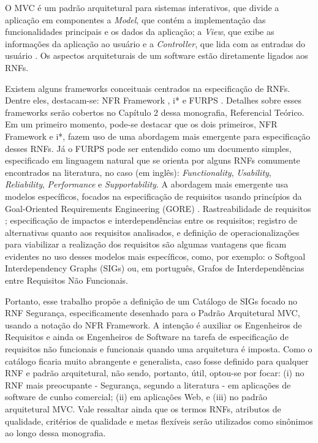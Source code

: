 O MVC é um padrão arquitetural para sistemas interativos, que divide a aplicação em componentes a \textit{Model}, que contém a implementação das funcionalidades principais e os dados da aplicação; a \textit{View}, que exibe as informações da aplicação ao usuário e a \textit{Controller}, que lida com as entradas do usuário \cite{buschmann1996system}. Os aspectos arquiteturais de um software estão diretamente ligados aos RNFs.



Existem alguns frameworks conceituais centrados na especificação de RNFs. Dentre eles, destacam-se: NFR Framework \cite{chung2009non}, i* \cite{istarwiki20} e FURPS \cite{umar2011analyzing}. Detalhes sobre esses frameworks serão cobertos no Capítulo 2 dessa monografia, Referencial Teórico. Em um primeiro momento, pode-se destacar que os dois primeiros, NFR Framework e i*, fazem uso de uma abordagem mais emergente para especificação desses RNFs. Já o FURPS pode ser entendido como um documento simples, especificado em linguagem natural que se orienta por alguns RNFs comumente encontrados na literatura, no caso (em inglês): \textit{Functionality}, \textit{Usability}, \textit{Reliability}, \textit{Performance} e \textit{Supportability}.
A abordagem mais emergente usa modelos específicos, focados na especificação de requisitos usando princípios da Goal-Oriented Requirements Engineering (GORE) \cite{horkoff2016goal}. Rastreabilidade de requisitos \cite{wiegers2013software}; especificação de impactos e interdependências entre os requisitos; registro de alternativas quanto aos requisitos analisados, e definição de operacionalizações para viabilizar a realização dos requisitos são algumas vantagens que ficam evidentes no uso desses modelos mais específicos, como, por exemplo: o Softgoal Interdependency Graphs (SIGs) \cite{chung2012non} ou, em português, Grafos de Interdependências entre Requisitos Não Funcionais. 

Portanto, esse trabalho propõe a definição de um Catálogo de SIGs focado no RNF Segurança, especificamente desenhado para o Padrão Arquitetural MVC, usando a notação do NFR Framework. A intenção é auxiliar os Engenheiros de Requisitos e ainda os Engenheiros de Software na tarefa de especificação de requisitos não funcionais e funcionais quando uma arquitetura é imposta. Como o catálogo ficaria muito abrangente e generalista, caso fosse definido para qualquer RNF e padrão arquitetural, não sendo, portanto, útil, optou-se por focar: (i) no RNF mais preocupante - Segurança, segundo a literatura - em aplicações de software de cunho comercial; (ii) em aplicações Web, e (iii) no padrão arquitetural MVC.  Vale ressaltar ainda que os termos RNFs, atributos de qualidade, critérios de qualidade e metas flexíveis serão utilizados como sinônimos ao longo dessa monografia.


